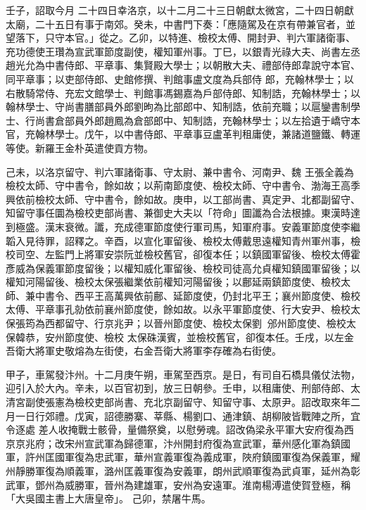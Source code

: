 \begin{pinyinscope}
 壬子，詔取今月
 二十四日幸洛京，以十二月二十三日朝獻太微宮，二十四日朝獻太廟，二十五日有事于南郊。癸未，中書門下奏：「應隨駕及在京有帶兼官者，並望落下，只守本官。」從之。乙卯，以特進、檢校太傅、開封尹、判六軍諸衛事、充功德使王瓚為宣武軍節度副使，權知軍州事。丁巳，以銀青光祿大夫、尚書左丞趙光允為中書侍郎、平章事、集賢殿大學士；以朝散大夫、禮部侍郎韋說守本官、同平章事；以吏部侍郎、史館修撰、判館事盧文度為兵部侍
 郎，充翰林學士；以右散騎常侍、充宏文館學士、判館事馮錫嘉為戶部侍郎、知制誥，充翰林學士；以翰林學士、守尚書膳部員外郎劉昫為比部郎中、知制誥，依前充職；以扈鑾書制學士、行尚書倉部員外郎趙鳳為倉部郎中、知制誥，充翰林學士；以左拾遺于嶠守本官，充翰林學士。戊午，以中書侍郎、平章事豆盧革判租庸使，兼諸道鹽鐵、轉運等使。新羅王金朴英遣使貢方物。



 己未，以洛京留守、判六軍諸衛事、守太尉、兼中書令、河南尹、魏
 王張全義為檢校太師、守中書令，餘如故；以荊南節度使、檢校太師、守中書令、渤海王高季興依前檢校太師、守中書令，餘如故。庚申，以工部尚書、真定尹、北都副留守、知留守事任圜為檢校吏部尚書、兼御史大夫以「符命」圖讖為合法根據。東漢時達到極盛。漢末衰微。讖，充成德軍節度使行軍司馬，知軍府事。安義軍節度使李繼韜入見待罪，詔釋之。辛酉，以宣化軍留後、檢校太傅戴思遠權知青州軍州事，檢校司空、左監門上將軍安崇阮並檢校舊官，卻復本任；以鎮國軍留後、檢校太傅霍
 彥威為保義軍節度留後；以權知威化軍留後、檢校司徒高允貞權知鎮國軍留後；以權知河陽留後、檢校太保張繼業依前權知河陽留後；以鄜延兩鎮節度使、檢校太師、兼中書令、西平王高萬興依前鄜、延節度使，仍封北平王；襄州節度使、檢校太傅、平章事孔勍依前襄州節度使，餘如故。以永平軍節度使、行大安尹、檢校太保張筠為西都留守、行京兆尹；以晉州節度使、檢校太保劉，邠州節度使、檢校太保韓恭，安州節度使、檢校
 太保硃漢賓，並檢校舊官，卻復本任。壬戌，以左金吾衛大將軍史敬熔為左街使，右金吾衛大將軍李存確為右街使。


甲子，車駕發汴州。十二月庚午朔，車駕至西京。是日，有司自石橋具儀仗法物，迎引入於大內。辛未，以百官初到，放三日朝參。壬申，以租庸使、刑部侍郎、太清宮副使張憲為檢校吏部尚書、充北京副留守、知留守事、太原尹。詔改取來年二月一日行郊禮。戊寅，詔德勝寨、莘縣、楊劉口、通津鎮、胡柳陂皆戰陣之所，宜令逐處
 差人收掩戰士骸骨，量備祭奠，以慰勞魂。詔改偽梁永平軍大安府復為西京京兆府；改宋州宣武軍為歸德軍，汴州開封府復為宣武軍，華州感化軍為鎮國軍，許州匡國軍復為忠武軍，華州宣義軍復為義成軍，陜府鎮國軍復為保義軍，耀州靜勝軍復為順義軍，潞州匡義軍復為安義軍，朗州武順軍復為武貞軍，延州為彰武軍，鄧州為威勝軍，晉州為建雄軍，安州為安遠軍。淮南楊溥遣使賀登極，稱「大吳國主書上大唐皇帝」。
 己卯，禁屠牛馬。




\end{pinyinscope}

